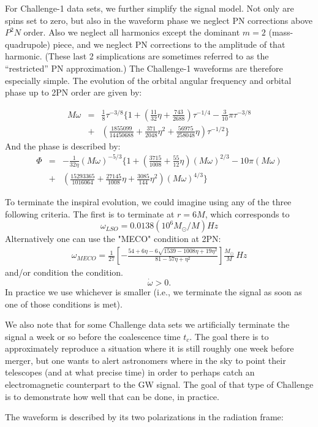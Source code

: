 \documentclass[11pt]{report}
\def\be{\begin{equation}}
\def\ee{\end{equation}}
\def\bea{\begin{eqnarray}}
\def\ena{\end{eqnarray}}
\begin{document}
For Challenge-1 data sets, we further simplify the signal model.  Not only are spins set to zero, but
also in the waveform phase we neglect PN corrections above $P^2N$ order. Also  
we neglect all harmonics except the dominant $m=2$ (mass-quadrupole) piece, and we neglect PN 
corrections to the amplitude of that harmonic. (These last 2 simplications are sometimes referred to as
the ``restricted'' PN approximation.)  The Challenge-1 waveforms are therefore especially simple.
The evolution of the orbital angular frequency 
and orbital phase up to 2PN order are given by:

\bea
M\omega &=& \frac{1}{8} \tau^{-3/8}\Biggl\{ 1 + \left( \frac{11}{32}\eta + \frac{743}{2688}\right) 
\tau^{-1/4} - \frac{3}{10}\pi\tau^{-3/8} \nonumber \\
& + & \left(\frac{1855099}{14450688} + \frac{371}{2048}\eta^2 
+ \frac{56975}{258048}\eta\right)
\tau^{-1/2}  \Biggr\}
\label{fr}
\ena
And the phase is described by:
\bea
\Phi &=& -\frac{1}{32\eta}(M\omega)^{-5/3}\Biggl\{ 1 + \left( \frac{3715}{1008} + \frac{55}{12}\eta\right)
(M\omega)^{2/3} - 10\pi(M\omega)  \nonumber \\
&+&  \left( \frac{15293365}{1016064} + \frac{27145}{1008}\eta + \frac{3085}{144}\eta^2\right)
(M\omega)^{4/3}\Biggr\}
\ena

To terminate the inspiral evolution, we could imagine using any of the three following criteria.
The first is to terminate at $r=6M$, which corresponds to 
\be
\omega_{LSO} = 0.0138(10^6M_{\odot}/M)Hz
\ee
Alternatively one can use the "MECO" condition at 2PN:
\bea
\omega_{MECO} = \frac1{27}\left[ 
-\frac{54 + 6\eta - 6\sqrt{1539 -1008\eta + 19\eta^2}}
{81 - 57\eta + \eta^2}\right]\frac{M_{\odot}}{M}\, Hz
\ena
and/or condition the condition.
$$
\dot{\omega} > 0.
$$
In practice we use whichever is smaller (i.e., we terminate the signal as soon as one of those conditions is met). 

We also note that for some Challenge data sets we artificially terminate the signal 
a week or so before the coalescence time $t_c$. The goal there is to approximately reproduce a situation
where it is still roughly one week before merger, but one wants to alert astronomers where in the sky to
point their telescopes (and at what precise time) in order to perhaps catch an electromagnetic counterpart
to the GW signal. The goal of that type of Challenge is to demonstrate how well that can be done, in practice.

The waveform is described by its two polarizations in the
radiation frame:
\end{document}
